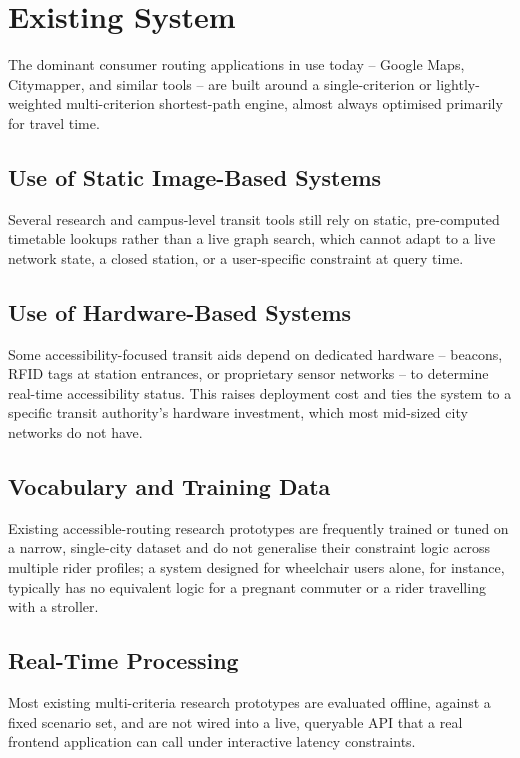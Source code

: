 \documentclass[12pt,a4paper]{report}
\begin{document}
\section{Existing System}

The dominant consumer routing applications in use today -- Google Maps, Citymapper, and similar
tools -- are built around a single-criterion or lightly-weighted multi-criterion shortest-path
engine, almost always optimised primarily for travel time.

\subsection{Use of Static Image-Based Systems}
Several research and campus-level transit tools still rely on static, pre-computed timetable
lookups rather than a live graph search, which cannot adapt to a live network state, a closed
station, or a user-specific constraint at query time.

\subsection{Use of Hardware-Based Systems}
Some accessibility-focused transit aids depend on dedicated hardware -- beacons, RFID tags at
station entrances, or proprietary sensor networks -- to determine real-time accessibility status.
This raises deployment cost and ties the system to a specific transit authority's hardware
investment, which most mid-sized city networks do not have.

\subsection{Vocabulary and Training Data}
Existing accessible-routing research prototypes are frequently trained or tuned on a narrow,
single-city dataset and do not generalise their constraint logic across multiple rider profiles;
a system designed for wheelchair users alone, for instance, typically has no equivalent logic for
a pregnant commuter or a rider travelling with a stroller.

\subsection{Real-Time Processing}
Most existing multi-criteria research prototypes are evaluated offline, against a fixed scenario
set, and are not wired into a live, queryable API that a real frontend application can call under
interactive latency constraints.
\end{document}
